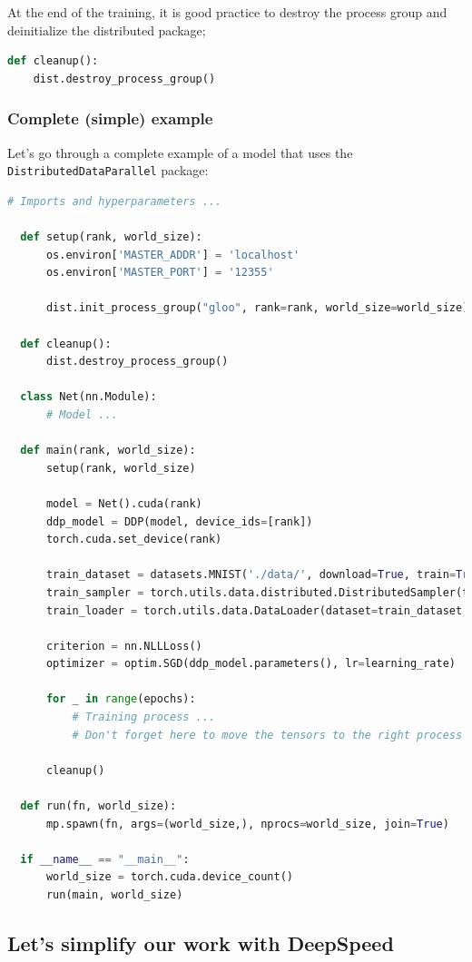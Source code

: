\documentclass{article}
\begin{document}
At the end of the training, it is good practice to destroy the process group and deinitialize the distributed package;
\begin{lstlisting}[language=Python]
  def cleanup():
    dist.destroy_process_group()
\end{lstlisting}

\subsubsection{Complete (simple) example}
Let's go through a complete example of a model that uses the \lstinline{DistributedDataParallel} package:
\begin{lstlisting}[language=Python]
  # Imports and hyperparameters ...

  def setup(rank, world_size):
      os.environ['MASTER_ADDR'] = 'localhost'
      os.environ['MASTER_PORT'] = '12355'

      dist.init_process_group("gloo", rank=rank, world_size=world_size)

  def cleanup():
      dist.destroy_process_group()

  class Net(nn.Module):
      # Model ...

  def main(rank, world_size):
      setup(rank, world_size)

      model = Net().cuda(rank)
      ddp_model = DDP(model, device_ids=[rank])
      torch.cuda.set_device(rank)

      train_dataset = datasets.MNIST('./data/', download=True, train=True, transform=transform)
      train_sampler = torch.utils.data.distributed.DistributedSampler(train_dataset, num_replicas=world_size, rank=rank, shuffle=False)
      train_loader = torch.utils.data.DataLoader(dataset=train_dataset, batch_size=batch_size, shuffle=False, pin_memory=True, sampler=train_sampler)

      criterion = nn.NLLLoss()
      optimizer = optim.SGD(ddp_model.parameters(), lr=learning_rate)

      for _ in range(epochs):
          # Training process ...
          # Don't forget here to move the tensors to the right process using the .cuda(rank) method!

      cleanup()

  def run(fn, world_size):
      mp.spawn(fn, args=(world_size,), nprocs=world_size, join=True)

  if __name__ == "__main__":
      world_size = torch.cuda.device_count()
      run(main, world_size)
\end{lstlisting}

\subsection{Let's simplify our work with DeepSpeed}

\clearpage
\printglossaries

\clearpage


\clearpage

\end{document}
